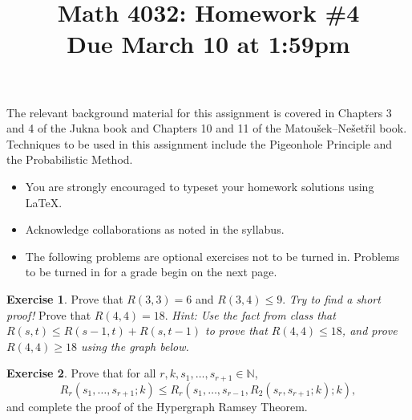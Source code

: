 \documentclass[11pt]{amsart}
\title[Math 4032: Homework \#4\qquad Due March 10 at 1:59pm]{Math 4032: Homework \#4\\
  Due March 10 at 1:59pm}
\theoremstyle{definition}
\newtheorem{exercise}{Exercise}[]
\begin{document}
\maketitle

The relevant background material for this assignment is covered in Chapters 3 and 4 of the Jukna book and Chapters 10 and 11 of the Matou\v{s}ek--Ne\v{s}et\v{r}il book.  Techniques to be used in this assignment include the Pigeonhole Principle and the Probabilistic Method.
\begin{itemize}
\item You are strongly encouraged to typeset your homework solutions using \LaTeX.
\item Acknowledge collaborations as noted in the syllabus.
\item The following problems are optional exercises not to be turned in.  Problems to be turned in for a grade begin on the next page.  
\end{itemize}


\begin{exercise}
  Prove that $R(3, 3) = 6$ and $R(3, 4) \leq 9$.  \textit{Try to find a short proof!}  Prove that $R(4, 4) = 18$.  \textit{Hint: Use the fact from class that $R(s, t) \leq R(s - 1, t) + R(s, t - 1)$ to prove that $R(4, 4) \leq 18$, and prove $R(4, 4) \geq 18$ using the graph below.}
\end{exercise}

\begin{center}
\end{center}

\begin{exercise}
  Prove that for all $r, k, s_1, \dots, s_{r+1} \in \mathbb N$,
  \begin{equation*}
    R_r(s_1, \dots, s_{r+1}; k) \leq R_r(s_1, \dots, s_{r-1}, R_2(s_r, s_{r+1}; k); k),
  \end{equation*}
  and complete the proof of the Hypergraph Ramsey Theorem.  
\end{exercise}
\end{document}
